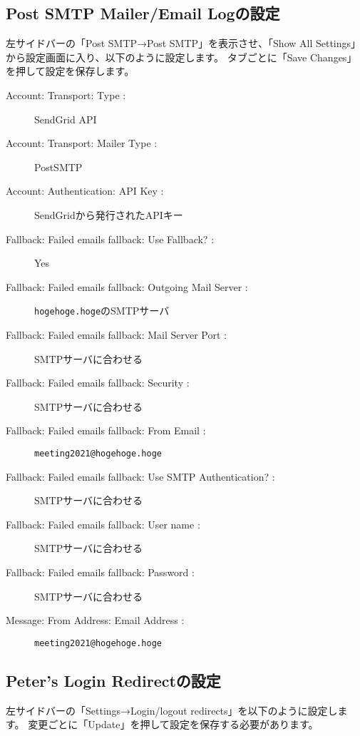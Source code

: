 \documentclass[titlepage,10pt,a4paper,uplatex]{jsbook}
\begin{document}
\subsection{Post SMTP Mailer/Email Logの設定}

左サイドバーの「Post SMTP→Post SMTP」を表示させ、「Show All Settings」から設定画面に入り、以下のように設定します。
タブごとに「Save Changes」を押して設定を保存します。

\begin{description}
\item[Account: Transport: Type : ] SendGrid API
\item[Account: Transport: Mailer Type : ] PostSMTP
\item[Account: Authentication: API Key : ] SendGridから発行されたAPIキー
\item[Fallback: Failed emails fallback: Use Fallback? : ] Yes
\item[Fallback: Failed emails fallback: Outgoing Mail Server : ] \texttt{hogehoge.hoge}のSMTPサーバ
\item[Fallback: Failed emails fallback: Mail Server Port : ] SMTPサーバに合わせる
\item[Fallback: Failed emails fallback: Security : ] SMTPサーバに合わせる
\item[Fallback: Failed emails fallback: From Email : ] \texttt{meeting2021@hogehoge.hoge}
\item[Fallback: Failed emails fallback: Use SMTP Authentication? : ] SMTPサーバに合わせる
\item[Fallback: Failed emails fallback: User name : ] SMTPサーバに合わせる
\item[Fallback: Failed emails fallback: Password : ] SMTPサーバに合わせる
\item[Message: From Address: Email Address : ] \texttt{meeting2021@hogehoge.hoge}
\end{description}

\subsection{Peter's Login Redirectの設定}

左サイドバーの「Settings→Login/logout redirects」を以下のように設定します。
変更ごとに「Update」を押して設定を保存する必要があります。
\end{document}

